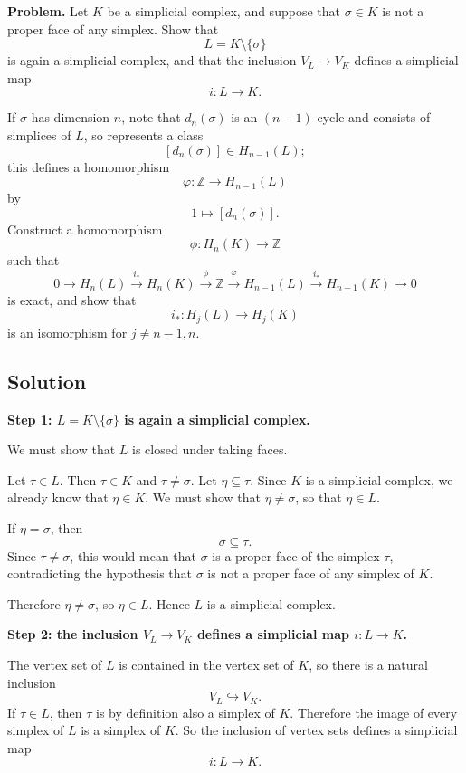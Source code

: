 \documentclass[12pt,a4paper]{article}
\theoremstyle{notespace}
\begin{document}
\textbf{Problem.}
Let \(K\) be a simplicial complex, and suppose that \(\sigma\in K\) is not a proper face of any simplex. Show that
\[
L=K\setminus\{\sigma\}
\]
is again a simplicial complex, and that the inclusion \(V_L\to V_K\) defines a simplicial map
\[
i:L\to K.
\]

If \(\sigma\) has dimension \(n\), note that \(d_n(\sigma)\) is an \((n-1)\)-cycle and consists of simplices of \(L\), so represents a class
\[
[d_n(\sigma)]\in H_{n-1}(L);
\]
this defines a homomorphism
\[
\varphi:\mathbb Z\to H_{n-1}(L)
\]
by
\[
1\mapsto [d_n(\sigma)].
\]
Construct a homomorphism
\[
\phi:H_n(K)\to \mathbb Z
\]
such that
\[
0\longrightarrow H_n(L)\xrightarrow{i_*} H_n(K)\xrightarrow{\phi} \mathbb Z
\xrightarrow{\varphi} H_{n-1}(L)\xrightarrow{i_*} H_{n-1}(K)\longrightarrow 0
\]
is exact, and show that
\[
i_*:H_j(L)\to H_j(K)
\]
is an isomorphism for \(j\neq n-1,n\).

\subsection{Solution}

\textbf{Step 1: \(L=K\setminus\{\sigma\}\) is again a simplicial complex.}

We must show that \(L\) is closed under taking faces.

Let \(\tau\in L\). Then \(\tau\in K\) and \(\tau\neq \sigma\). Let \(\eta\subseteq \tau\). Since \(K\) is a simplicial complex, we already know that \(\eta\in K\). We must show that \(\eta\neq \sigma\), so that \(\eta\in L\).

If \(\eta=\sigma\), then
\[
\sigma\subseteq \tau.
\]
Since \(\tau\neq \sigma\), this would mean that \(\sigma\) is a proper face of the simplex \(\tau\), contradicting the hypothesis that \(\sigma\) is not a proper face of any simplex of \(K\).

Therefore \(\eta\neq \sigma\), so \(\eta\in L\). Hence \(L\) is a simplicial complex.

\medskip

\textbf{Step 2: the inclusion \(V_L\to V_K\) defines a simplicial map \(i:L\to K\).}

The vertex set of \(L\) is contained in the vertex set of \(K\), so there is a natural inclusion
\[
V_L\hookrightarrow V_K.
\]
If \(\tau\in L\), then \(\tau\) is by definition also a simplex of \(K\). Therefore the image of every simplex of \(L\) is a simplex of \(K\). So the inclusion of vertex sets defines a simplicial map
\[
i:L\to K.
\]
\end{document}
